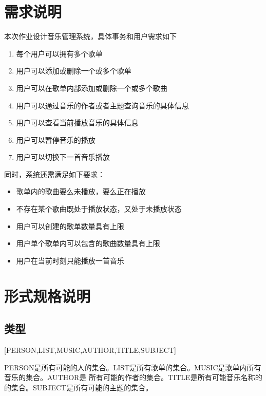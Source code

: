 \documentclass[14pt]{article}
\numberwithin{figure}{subsection}
\begin{document}
\tableofcontents

\clearpage
\section{需求说明}
本次作业设计音乐管理系统，具体事务和用户需求如下
\begin{enumerate}
    \setlength{\itemsep}{0pt}
          \setlength{\parsep}{0pt}
          \setlength{\parskip}{0pt}
    \item 每个用户可以拥有多个歌单
    \item 用户可以添加或删除一个或多个歌单
    \item 用户可以在歌单内部添加或删除一个或多个歌曲
    \item 用户可以通过音乐的作者或者主题查询音乐的具体信息
    \item 用户可以查看当前播放音乐的具体信息
    \item 用户可以暂停音乐的播放
    \item 用户可以切换下一首音乐播放
\end{enumerate}

同时，系统还需满足如下要求：

\begin{itemize}
    \setlength{\itemsep}{0pt}
          \setlength{\parsep}{0pt}
          \setlength{\parskip}{0pt}
    \item 歌单内的歌曲要么未播放，要么正在播放
    \item 不存在某个歌曲既处于播放状态，又处于未播放状态
    \item 用户可以创建的歌单数量具有上限
    \item 用户单个歌单内可以包含的歌曲数量具有上限
    \item 用户在当前时刻只能播放一首音乐
\end{itemize}

\section{形式规格说明}
\subsection{类型}
\centerline{[PERSON,LIST,MUSIC,AUTHOR,TITLE,SUBJECT]}

PERSON是所有可能的人的集合。LIST是所有歌单的集合。MUSIC是歌单内所有音乐的集合。AUTHOR是
所有可能的作者的集合。TITLE是所有可能音乐名称的的集合。SUBJECT是所有可能的主题的集合。
\vspace*{0.5cm}
\end{document}
